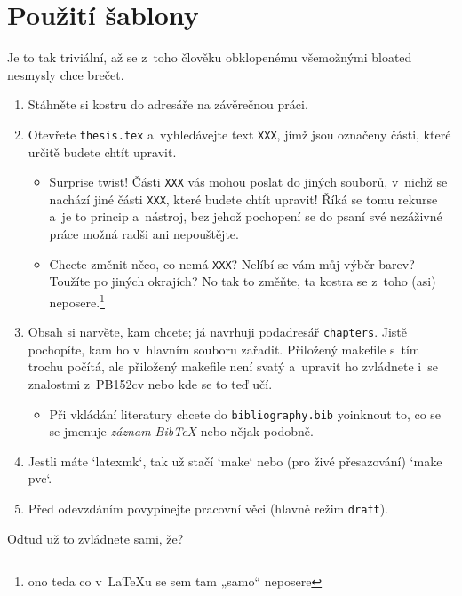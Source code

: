 \chapter{Použití šablony}

Je to tak triviální, až se z~toho člověku obklopenému všemožnými bloated
nesmysly chce brečet.

\begin{enumerate}
    \item Stáhněte si kostru do adresáře na závěrečnou práci.
    \item Otevřete \texttt{thesis.tex} a~vyhledávejte text \texttt{XXX}, jímž
    jsou označeny části, které určitě budete chtít upravit.
    \begin{itemize}
        \item Surprise twist! Části \texttt{XXX} vás mohou poslat do jiných
        souborů, v~nichž se nachází jiné části \texttt{XXX}, které budete chtít
        upravit! Říká se tomu rekurse a~je to princip a~nástroj, bez jehož
        pochopení se do psaní své nezáživné práce možná radši ani nepouštějte.
        \item Chcete změnit něco, co nemá \texttt{XXX}? Nelíbí se vám můj výběr
        barev? Toužíte po jiných okrajích? No tak to změňte, ta kostra se z~toho
        (asi) neposere.\footnote{ono teda co v~\LaTeX u se sem tam „samo“ neposere}
    \end{itemize}
    \item Obsah si narvěte, kam chcete; já navrhuji podadresář
    \texttt{chapters}. Jistě pochopíte, kam ho v~hlavním souboru zařadit.
    Přiložený makefile s~tím trochu počítá, ale přiložený makefile není svatý
    a~upravit ho zvládnete i~se znalostmi z~PB152cv nebo kde se to teď učí.
    \begin{itemize}
        \item Při vkládání literatury chcete do \texttt{bibliography.bib}
        yoinknout to, co se se jmenuje \emph{záznam BibTeX} nebo nějak podobně.
    \end{itemize}
    \item Jestli máte `latexmk`, tak už stačí `make` nebo (pro živé přesazování)
    `make pvc`.
    \item Před odevzdáním povypínejte pracovní věci (hlavně režim
    \texttt{draft}).
\end{enumerate}

Odtud už to zvládnete sami, že?

